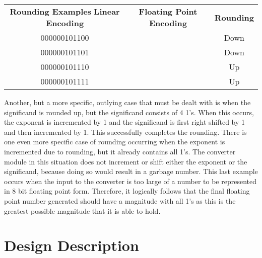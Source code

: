 \documentclass{article}
\begin{document}
\begin{center}
\begin{tabular}{ c c c }

\textbf{Rounding Examples}
 \textbf{Linear Encoding} & \textbf{Floating Point Encoding} & \textbf{Rounding } \\ 
000000101100 & \big[0 010 1011\big] & Down \\
000000101101 & \big[0 010 1011\big] & Down \\ 
000000101110 & \big[0 010 1100\big] & Up \\
000000101111 & \big[0 010 1100\big] & Up \\

\end{tabular}
\end{center}

Another, but a more specific, outlying case that must be dealt with is when the significand is rounded up, but the significand consists of 4 1's. When this occurs, the exponent is incremented by 1 and the significand is first right shifted by 1 and then incremented by 1.  This successfully completes the rounding.  There is one even more specific case of rounding occurring when the exponent is incremented due to rounding, but it already contains all 1's. The converter module in this situation does not increment or shift either the exponent or the significand, because doing so would result in a garbage number.  This last example occurs when the input to the converter is too large of a number to be represented in 8 bit floating point form. Therefore, it logically follows that the final floating point number generated should have a magnitude with all 1's as this is the greatest possible magnitude that it is able to hold.

 

\section*{Design Description}

\end{document}

